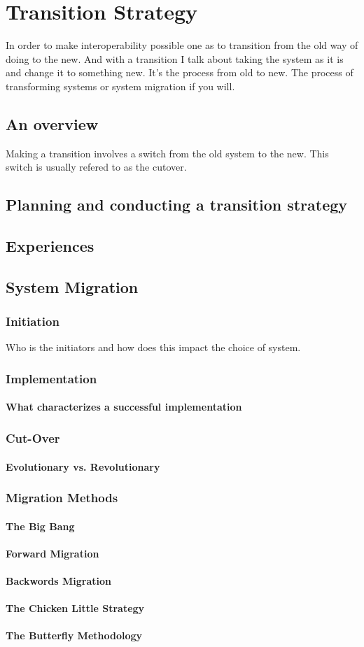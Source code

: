 \chapter{Transition Strategy}
In order to make interoperability possible one as to transition from the old way of doing to the new.
And with a transition I talk about taking the system as it is and change it to something new. It's the process from old to new.
The process of transforming systems or system migration if you will.
\section{An overview}
Making a transition involves a switch from the old system to the new. This switch is usually refered to as the cutover.
\section{Planning and conducting a transition strategy}
\section{Experiences}
\section{System Migration \cite{2} \cite{8}}
\subsection{Initiation}
Who is the initiators and how does this impact the choice of system.
\subsection{Implementation}
\subsubsection{What characterizes a successful implementation}
\subsection{Cut-Over}
\subsubsection{Evolutionary vs. Revolutionary}
\subsection{Migration Methods}
\subsubsection{The Big Bang}
\subsubsection{Forward Migration}
\subsubsection{Backwords Migration}
\subsubsection{The Chicken Little Strategy}
\subsubsection{The Butterfly Methodology}
